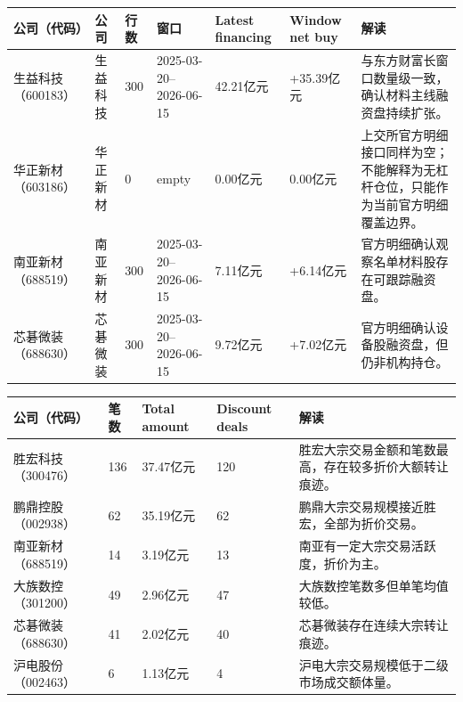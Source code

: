\begin{exhibitbox}
\small
\begin{tabularx}{\textwidth}{L{1.6cm}L{2.1cm}R{1.2cm}L{2.7cm}R{2.0cm}R{2.0cm}X}
\toprule
\textbf{公司（代码）} & \textbf{公司} & \textbf{行数} & \textbf{窗口} & \textbf{Latest financing} & \textbf{Window net buy} & \textbf{解读} \\
\midrule
生益科技（600183） & 生益科技 & 300 & 2025-03-20--2026-06-15 & 42.21亿元 & +35.39亿元 & 与东方财富长窗口数量级一致，确认材料主线融资盘持续扩张。 \\
华正新材（603186） & 华正新材 & 0 & empty & 0.00亿元 & 0.00亿元 & 上交所官方明细接口同样为空；不能解释为无杠杆仓位，只能作为当前官方明细覆盖边界。 \\
南亚新材（688519） & 南亚新材 & 300 & 2025-03-20--2026-06-15 & 7.11亿元 & +6.14亿元 & 官方明细确认观察名单材料股存在可跟踪融资盘。 \\
芯碁微装（688630） & 芯碁微装 & 300 & 2025-03-20--2026-06-15 & 9.72亿元 & +7.02亿元 & 官方明细确认设备股融资盘，但仍非机构持仓。 \\
\bottomrule
\end{tabularx}
\end{exhibitbox}

\begin{exhibitbox}
\footnotesize
\begin{tabularx}{\textwidth}{L{1.8cm}R{1.4cm}R{1.8cm}R{1.7cm}X}
\toprule
\textbf{公司（代码）} & \textbf{笔数} & \textbf{Total amount} & \textbf{Discount deals} & \textbf{解读} \\
\midrule
胜宏科技（300476） & 136 & 37.47亿元 & 120 & 胜宏大宗交易金额和笔数最高，存在较多折价大额转让痕迹。 \\
鹏鼎控股（002938） & 62 & 35.19亿元 & 62 & 鹏鼎大宗交易规模接近胜宏，全部为折价交易。 \\
南亚新材（688519） & 14 & 3.19亿元 & 13 & 南亚有一定大宗交易活跃度，折价为主。 \\
大族数控（301200） & 49 & 2.96亿元 & 47 & 大族数控笔数多但单笔均值较低。 \\
芯碁微装（688630） & 41 & 2.02亿元 & 40 & 芯碁微装存在连续大宗转让痕迹。 \\
沪电股份（002463） & 6 & 1.13亿元 & 4 & 沪电大宗交易规模低于二级市场成交额体量。 \\
\bottomrule
\end{tabularx}
\end{exhibitbox}

